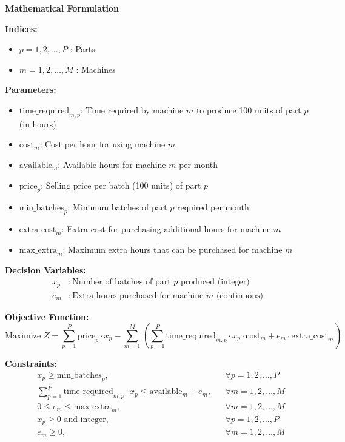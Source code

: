 \documentclass{article}
\begin{document}
\textbf{Mathematical Formulation}

\textbf{Indices:}
\begin{itemize}
    \item \( p = 1, 2, \ldots, P \) : Parts
    \item \( m = 1, 2, \ldots, M \) : Machines
\end{itemize}

\textbf{Parameters:}
\begin{itemize}
    \item \( \text{time\_required}_{m,p} \): Time required by machine \( m \) to produce 100 units of part \( p \) (in hours)
    \item \( \text{cost}_{m} \): Cost per hour for using machine \( m \)
    \item \( \text{available}_{m} \): Available hours for machine \( m \) per month
    \item \( \text{price}_{p} \): Selling price per batch (100 units) of part \( p \)
    \item \( \text{min\_batches}_{p} \): Minimum batches of part \( p \) required per month
    \item \( \text{extra\_cost}_{m} \): Extra cost for purchasing additional hours for machine \( m \)
    \item \( \text{max\_extra}_{m} \): Maximum extra hours that can be purchased for machine \( m \)
\end{itemize}

\textbf{Decision Variables:}
\begin{align*}
    x_p & : \text{Number of batches of part } p \text{ produced (integer)} \\
    e_m & : \text{Extra hours purchased for machine } m \text{ (continuous)}
\end{align*}

\textbf{Objective Function:}
\[
\text{Maximize } Z = \sum_{p=1}^{P} \text{price}_{p} \cdot x_p - \sum_{m=1}^{M} \left( \sum_{p=1}^{P} \text{time\_required}_{m,p} \cdot x_p \cdot \text{cost}_{m} + e_m \cdot \text{extra\_cost}_{m} \right)
\]

\textbf{Constraints:}
\begin{align*}
    & x_p \geq \text{min\_batches}_{p}, && \forall p = 1, 2, \ldots, P \\
    & \sum_{p=1}^{P} \text{time\_required}_{m,p} \cdot x_p \leq \text{available}_{m} + e_m, && \forall m = 1, 2, \ldots, M \\
    & 0 \leq e_m \leq \text{max\_extra}_{m}, && \forall m = 1, 2, \ldots, M \\
    & x_p \geq 0 \text{ and integer}, && \forall p = 1, 2, \ldots, P \\
    & e_m \geq 0, && \forall m = 1, 2, \ldots, M
\end{align*}
\end{document}
